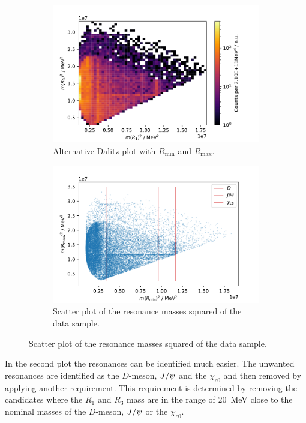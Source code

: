 \begin{figure}[H]
	\centering
	\begin{subfigure}{0.45\textwidth}
			\includegraphics[width=\textwidth]{content/pictures/image_fin/DalitzMINMAXDataHist.pdf}
			\caption{Alternative Dalitz plot with $R_\mathrm{min}$ and $R_\mathrm{max}$.}
			\label{fig:dalitzalt}
	\end{subfigure}
	\begin{subfigure}{0.45\textwidth}
		\includegraphics[width=\textwidth]{content/pictures/image_fin/DalitzData}
		\caption{Scatter plot of the resonance masses squared of the data sample.}
		\label{fig:dalitzdata}
	\end{subfigure} 
\end{figure}

In the second plot the resonances can be identified much easier. The unwanted resonances are identified as the $D$-meson, $J\-/\-\psi$ and the $\chi_{c0}$ and then removed by applying another requirement. This requirement is determined by removing the candidates where the $R_1$ and $R_3$ mass are in the range of \qty{20}{\mega\eV} close to the nominal masses of the $D$-meson, $J\-/\-\psi$ or the $\chi_{c0}$.\\

